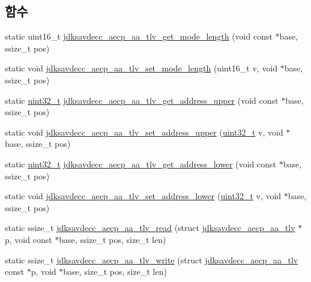 \subsection*{함수}
\begin{DoxyCompactItemize}
\item 
static uint16\+\_\+t \hyperlink{group__aecp__aa__tlv_gab216c61c803887b69f5bed56b7291fe2}{jdksavdecc\+\_\+aecp\+\_\+aa\+\_\+tlv\+\_\+get\+\_\+mode\+\_\+length} (void const $\ast$base, ssize\+\_\+t pos)
\item 
static void \hyperlink{group__aecp__aa__tlv_ga9d477a8f40223f0f2769743ebaeada3e}{jdksavdecc\+\_\+aecp\+\_\+aa\+\_\+tlv\+\_\+set\+\_\+mode\+\_\+length} (uint16\+\_\+t v, void $\ast$base, ssize\+\_\+t pos)
\item 
static \hyperlink{parse_8c_a6eb1e68cc391dd753bc8ce896dbb8315}{uint32\+\_\+t} \hyperlink{group__aecp__aa__tlv_ga716b6083b980c94e32875aa603166baf}{jdksavdecc\+\_\+aecp\+\_\+aa\+\_\+tlv\+\_\+get\+\_\+address\+\_\+upper} (void const $\ast$base, ssize\+\_\+t pos)
\item 
static void \hyperlink{group__aecp__aa__tlv_ga86a4c9467c75ebb6f721637d414097dd}{jdksavdecc\+\_\+aecp\+\_\+aa\+\_\+tlv\+\_\+set\+\_\+address\+\_\+upper} (\hyperlink{parse_8c_a6eb1e68cc391dd753bc8ce896dbb8315}{uint32\+\_\+t} v, void $\ast$base, ssize\+\_\+t pos)
\item 
static \hyperlink{parse_8c_a6eb1e68cc391dd753bc8ce896dbb8315}{uint32\+\_\+t} \hyperlink{group__aecp__aa__tlv_ga11c316fda9bff646d2d134e03c39d6a4}{jdksavdecc\+\_\+aecp\+\_\+aa\+\_\+tlv\+\_\+get\+\_\+address\+\_\+lower} (void const $\ast$base, ssize\+\_\+t pos)
\item 
static void \hyperlink{group__aecp__aa__tlv_ga9fd8f39fee9c3ddc79b29e4b16681a1e}{jdksavdecc\+\_\+aecp\+\_\+aa\+\_\+tlv\+\_\+set\+\_\+address\+\_\+lower} (\hyperlink{parse_8c_a6eb1e68cc391dd753bc8ce896dbb8315}{uint32\+\_\+t} v, void $\ast$base, ssize\+\_\+t pos)
\item 
static ssize\+\_\+t \hyperlink{group__aecp__aa__tlv_gaf24b855de109d9c012ec94d9ab5ba03a}{jdksavdecc\+\_\+aecp\+\_\+aa\+\_\+tlv\+\_\+read} (struct \hyperlink{structjdksavdecc__aecp__aa__tlv}{jdksavdecc\+\_\+aecp\+\_\+aa\+\_\+tlv} $\ast$p, void const $\ast$base, ssize\+\_\+t pos, size\+\_\+t len)
\item 
static ssize\+\_\+t \hyperlink{group__aecp__aa__tlv_ga6540f6de6d7c49a5455ac50128be2dba}{jdksavdecc\+\_\+aecp\+\_\+aa\+\_\+tlv\+\_\+write} (struct \hyperlink{structjdksavdecc__aecp__aa__tlv}{jdksavdecc\+\_\+aecp\+\_\+aa\+\_\+tlv} const $\ast$p, void $\ast$base, size\+\_\+t pos, size\+\_\+t len)
\end{DoxyCompactItemize}


